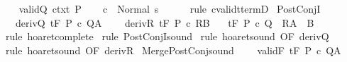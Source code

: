 \begin{isabellebody}
\ \ \isamarkupfalse%
\ valid{\isacharunderscore}Q\ ctxt\ P\isanewline
\ \ \isamarkupfalse%
\ {\isachardoublequoteopen}{\isasymGamma}{\isasymturnstile}c\ {\isasymdown}\ Normal\ s{\isachardoublequoteclose}\isanewline
\ \ \ \ \isamarkupfalse%
\ {\isacharparenleft}rule\ cvalidt{\isacharunderscore}termD{\isacharparenright}\isanewline
{}\isamarkupfalse%
%
\endisatagproof
{\isafoldproof}%
%
\isadelimproof
\isanewline
%
\endisadelimproof
\isanewline
{}\isamarkupfalse%
\ PostConjI{\isacharcolon}\isanewline
\ \ \ deriv{\isacharunderscore}Q{\isacharcolon}\ {\isachardoublequoteopen}{\isasymGamma}{\isacharcomma}{\isasymTheta}{\isasymturnstile}\isactrlsub t\isactrlbsub {\isacharslash}F\isactrlesub \ P\ c\ Q{\isacharcomma}A{\isachardoublequoteclose}\ \isanewline
\ \ \ deriv{\isacharunderscore}R{\isacharcolon}\ {\isachardoublequoteopen}{\isasymGamma}{\isacharcomma}{\isasymTheta}{\isasymturnstile}\isactrlsub t\isactrlbsub {\isacharslash}F\isactrlesub \ P\ c\ R{\isacharcomma}B{\isachardoublequoteclose}\isanewline
\ \ \ {\isachardoublequoteopen}{\isasymGamma}{\isacharcomma}{\isasymTheta}{\isasymturnstile}\isactrlsub t\isactrlbsub {\isacharslash}F\isactrlesub \ P\ c\ {\isacharparenleft}Q\ {\isasyminter}\ R{\isacharparenright}{\isacharcomma}{\isacharparenleft}A\ {\isasyminter}\ B{\isacharparenright}{\isachardoublequoteclose}\isanewline
%
\isadelimproof
%
\endisadelimproof
%
\isatagproof
{}\isamarkupfalse%
\ {\isacharparenleft}rule\ hoaret{\isacharunderscore}complete{\isacharprime}{\isacharparenright}\isanewline
{}\isamarkupfalse%
\ {\isacharparenleft}rule\ PostConjI{\isacharunderscore}sound{\isacharparenright}\isanewline
{}\isamarkupfalse%
\ {\isacharparenleft}rule\ hoaret{\isacharunderscore}sound\ {\isacharbrackleft}OF\ deriv{\isacharunderscore}Q{\isacharbrackright}{\isacharparenright}\isanewline
{}\isamarkupfalse%
\ {\isacharparenleft}rule\ hoaret{\isacharunderscore}sound\ {\isacharbrackleft}OF\ deriv{\isacharunderscore}R{\isacharbrackright}{\isacharparenright}\isanewline
{}\isamarkupfalse%
%
\endisatagproof
{\isafoldproof}%
%
\isadelimproof
\isanewline
%
\endisadelimproof
\isanewline
\isanewline
{}\isamarkupfalse%
\ Merge{\isacharunderscore}PostConj{\isacharunderscore}sound{\isacharcolon}\ \isanewline
\ \ \ validF{\isacharcolon}\ {\isachardoublequoteopen}{\isasymGamma}{\isacharcomma}{\isasymTheta}{\isasymTurnstile}\isactrlsub t\isactrlbsub {\isacharslash}F\isactrlesub \ P\ c\ Q{\isacharcomma}A{\isachardoublequoteclose}\isanewline

\end{isabellebody}
